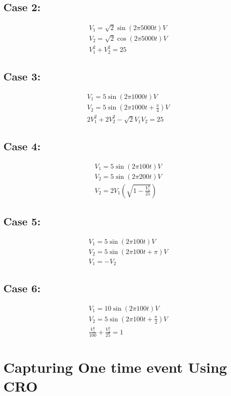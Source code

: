 \documentclass[a4paper,12pt]{article}
\begin{document}
\subsection{Case 2:}
\begin{align*}
    &V_1=\sqrt{2}\sin(2\pi 5000t)V\\
    &V_2=\sqrt{2}\cos(2\pi 5000t)V\\
    &V_1^2+V_2^2=25
\end{align*}

\subsection{Case 3:}

\begin{align*}
    &V_1=5\sin(2\pi 1000t)V\\
    &V_2=5\sin(2\pi 1000t+\frac{\pi}{4})V\\
    &2V_1^2+2V_2^2-\sqrt{2}V_1V_2=25
\end{align*}
\subsection{Case 4:}
\begin{align*}
    &V_1=5\sin(2\pi 100t)V\\
    &V_2=5\sin(2\pi 200t)V\\
    &V_2=2V_1(\sqrt{1-\frac{V_1^2}{25}})
\end{align*}


\subsection{Case 5:}
\begin{align*}
    &V_1=5\sin(2\pi 100t)V\\
    &V_2=5\sin(2\pi 100t+\pi )V\\
    &V_1=-V_2
\end{align*}



\subsection{Case 6:}
\begin{align*}
    &V_1=10\sin(2\pi 100t)V\\
    &V_2=5\sin(2\pi 100t+\frac{\pi}{2})V\\
    &\frac{V_1^2}{100}+\frac{V_2^2}{25}=1
\end{align*}


\section{Capturing One time event Using CRO}
\end{document}

